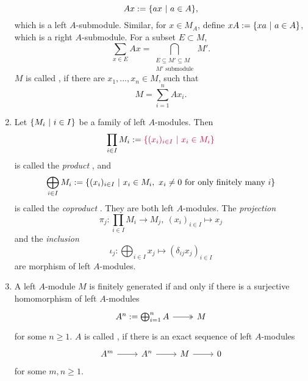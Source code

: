 \begin{rem}
\begin{enumerate}
    \[
    Ax:= \{ ax~|~ a\in A\},
    \]
    which is a left $A$-submodule. Similar, for $x\in M_A$, define $xA:= \{ xa~|~ a\in A\}$, which is a right $A$-submodule. For a subset $E\subset M$,
    \[
    \sum_{x\in E}Ax = \bigcap_{\substack{E\subseteq M'\subseteq M\\M' \text{ submodule}}}M'.
    \]
    $M$ is called , if there are $x_1,...,x_n\in M$, such that
    \[
    M = \sum_{i=1}^{n}Ax_i.
    \]
    \item Let $\{M_i~|~ i\in I\}$ be a family of left $A$-modules. Then
    \[
    \prod_{i\in I}M_i:=\color{purple} \{ (x_i)_{i\in I}~|~ x_i\in M_i\}\color{black}
    \]
    \color{purple} is called the \emph{product} \color{black}, and
    \[
    \bigoplus_{i\in I}M_i:= \{(x_i)_{i\in I}~|~ x_i\in M_i,~x_i\neq 0\text{ for only finitely many }i\}
    \]
    \color{purple} is called the \emph{coproduct} .\color{black} They are both left $A$-modules. The \emph{projection}
    \[
    \pi_j: \prod_{i\in I}M_i\to M_j,~(x_i)_{i\in I}\mapsto x_j
    \]
    and the \emph{inclusion}
    \[
    \iota_j: \bigoplus_{i\in I}x_j \mapsto (\delta_{ij}x_j)_{i\in I}
    \]
    are morphism of left $A$-modules.
    \item A left $A$-module $M$ is finitely generated if and only if there is a surjective homomorphism of left $A$-modules
    \[
    \begin{tikzcd}
      A^n:= \bigoplus_{i=1}^{n}A\ar[\surarr]{r}&M
    \end{tikzcd}
    \]
    for some $n\geq 1$.
    $A$ is called , if there is an exact sequence of left $A$-modules
    \[
    \begin{tikzcd}
      A^m\ar{r}&A^{n}\ar{r}&M\ar{r}&0
    \end{tikzcd}
    \]
    for some $m,n\geq 1$.
  \end{enumerate}
\end{rem}


